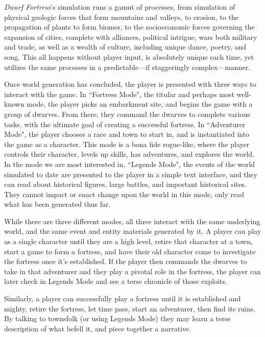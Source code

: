 \textit{Dwarf Fortress}'s simulation runs a gamut of processes, from simulation of physical geologic forces that form mountains and valleys, to erosion, to the propagation of plants to form biomes, to the socioeconomic forces governing the expansion of cities, complete with alliances, political intrigue, wars both military and trade, as well as a wealth of culture, including unique dance, poetry, and song. This all happens without player input, is absolutely unique each time, yet utilizes the same processes in a predictable---if staggeringly complex---manner.

Once world generation has concluded, the player is presented with three ways to interact with the game. In ``Fortress Mode", the titular and perhaps most well-known mode, the player picks an embarkment site, and begins the game with a group of dwarves. From there, they command the dwarves to complete various tasks, with the ultimate goal of creating a successful fortress. In ``Adventurer Mode", the player chooses a race and town to start in, and is instantiated into the game as a character. This mode is a bona fide rogue-like, where the player controls their character, levels up skills, has adventures, and explores the world. In the mode we are most interested in, ``Legends Mode", the events of the world simulated to date are presented to the player in a simple text interface, and they can read about historical figures, large battles, and important historical sites. They cannot impact or enact change upon the world in this mode, only read what has been generated thus far.

While there are three different modes, all three interact with the same underlying world, and the same event and entity materials generated by it. A player can play as a single character until they are a high level, retire that character at a town, start a game to form a fortress, and have their old character come to investigate the fortress once it's established. If the player then commands the dwarves to take in that adventurer and they play a pivotal role in the fortress, the player can later check in Legends Mode and see a terse chronicle of those exploits.

Similarly, a player can successfully play a fortress until it is established and mighty, retire the fortress, let time pass, start an adventurer, then find its ruins. By talking to townsfolk (or using Legends Mode) they may learn a terse description of what befell it, and piece together a narrative.

